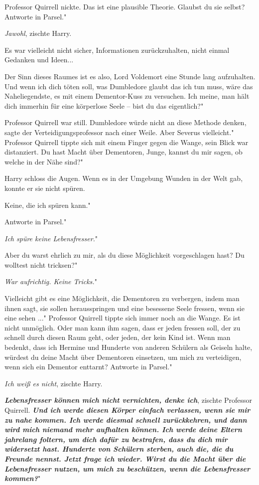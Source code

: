 Professor Quirrell nickte. \glqq{}Das ist eine plausible Theorie. Glaubst du sie
selbst? Antworte in Parsel."

\glqq{}\emph{Jawohl}\grqq{}, zischte Harry.

Es war vielleicht nicht sicher, Informationen zurückzuhalten, nicht einmal
Gedanken und Ideen...

\glqq{}Der Sinn dieses Raumes ist es also, Lord Voldemort eine Stunde lang
aufzuhalten. Und wenn ich dich töten soll, was Dumbledore glaubt das ich tun
muss, wäre das Naheliegendste, es mit einem Dementor-Kuss zu versuchen. Ich
meine, man hält dich immerhin für eine körperlose Seele – bist du das
eigentlich?"

Professor Quirrell war still. \glqq{}Dumbledore würde nicht an diese Methode
denken\grqq{}, sagte der Verteidigungsprofessor nach einer Weile. \glqq{}Aber
Severus vielleicht." Professor Quirrell tippte sich mit einem Finger gegen die
Wange, sein Blick war distanziert. \glqq{}Du hast Macht über Dementoren, Junge,
kannst du mir sagen, ob welche in der Nähe sind?"

Harry schloss die Augen. Wenn es in der Umgebung Wunden in der Welt gab, konnte
er sie nicht spüren.

\glqq{}Keine, die ich spüren kann."

\glqq{}Antworte in Parsel."

\glqq{}\emph{Ich spüre keine Lebensfresser.}"

\glqq{}Aber du warst ehrlich zu mir, als du diese Möglichkeit vorgeschlagen hast?
Du wolltest nicht tricksen?"

\glqq{}\emph{War aufrichtig. Keine Tricks.}"

\glqq{}Vielleicht gibt es eine Möglichkeit, die Dementoren zu verbergen, indem
man ihnen sagt, sie sollen herausspringen und eine besessene Seele fressen, wenn
sie eine sehen ..." Professor Quirrell tippte sich immer noch an die Wange.
\glqq{}Es ist nicht unmöglich. Oder man kann ihm sagen, dass er jeden fressen
soll, der zu schnell durch diesen Raum geht, oder jeden, der kein Kind ist. Wenn
man bedenkt, dass ich Hermine und Hunderte von anderen Schülern als Geiseln
halte, würdest du deine Macht über Dementoren einsetzen, um mich zu verteidigen,
wenn sich ein Dementor enttarnt? Antworte in Parsel."

\glqq{}\emph{Ich weiß es nicht}\grqq{}, zischte Harry.

\glqq{}\textbf{\emph{Lebensfresser können mich nicht vernichten, denke
ich}}\grqq{}, zischte Professor Quirrell. \glqq{}\textbf{\emph{Und ich werde
diesen Körper einfach verlassen, wenn sie mir zu nahe kommen. Ich werde diesmal
schnell zurückkehren, und dann wird mich niemand mehr aufhalten können. Ich
werde deine Eltern jahrelang foltern, um dich dafür zu bestrafen, dass du dich
mir widersetzt hast. Hunderte von Schülern sterben, auch die, die du Freunde
nennst. Jetzt frage ich wieder. Wirst du die Macht über die Lebensfresser
nutzen, um mich zu beschützen, wenn die Lebensfresser kommen?}}"


